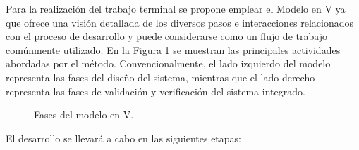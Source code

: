 Para la realización del trabajo terminal se propone emplear el Modelo en V ya que ofrece una visión detallada de los diversos pasos e interacciones relacionados con el proceso de desarrollo y puede considerarse como un flujo de trabajo comúnmente utilizado. En la Figura \ref{fig:IntroduccionMetodologia} se muestran las principales actividades abordadas por el método. Convencionalmente, el lado izquierdo del modelo representa las fases del diseño del sistema, mientras que el lado derecho representa las fases de validación y verificación del sistema integrado.

\begin{figure}[htbp!]
	\centering
	\caption{Fases del modelo en V.}
	\label{fig:IntroduccionMetodologia}
\end{figure}

El desarrollo se llevará a cabo en las siguientes etapas:

